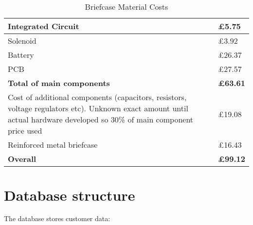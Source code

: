 \begin{table}[!htbp]
    \centering
        \begin{tabular}{|p{}|p{}|}
        \hline
        Integrated Circuit \cite{nxpDigikey} & £5.75 \\
        \hline
        Solenoid \cite{solenoidDigikey} & £3.92 \\
        \hline
        Battery \cite{batteryDigikey} & £26.37 \\
        \hline
        PCB \cite{pcbFabrication} & £27.57 \\
        \hline
        \textbf{Total of main components} & \textbf{£63.61} \\
        \hline
        Cost of additional components 
        (capacitors, resistors, voltage regulators etc). 
        Unknown exact amount until actual hardware developed so 
        30\% of main component price used & £19.08 \\
        \hline
        Reinforced metal briefcase \cite{reinforcedBriefcase} & £16.43 \\
        \hline
        \textbf{Overall} & \textbf{£99.12} \\
        \hline
    \end{tabular}
\caption{Briefcase Material Costs}
\label{tab:briefcasematcosts}
\end{table}
\newpage

\section{Database structure} \label{databaseAppendix}
The database stores customer data:

